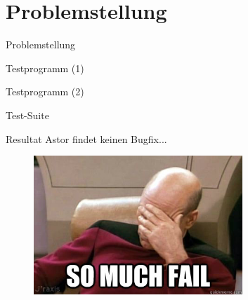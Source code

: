\section{Problemstellung}
%
\begin{frame}{}
	\begin{center}
		\huge{Problemstellung}
	\end{center}
\end{frame}
%
\begin{frame}{Testprogramm (1)}
	\begin{figure}
		\centering
	\end{figure}
\end{frame}
%
\begin{frame}{Testprogramm (2)}
	\begin{figure}
		\centering
	\end{figure}
\end{frame}
%
\begin{frame}{Test-Suite}
	\begin{figure}
		\centering
	\end{figure}
\end{frame}
%
\begin{frame}{Resultat}
	Astor findet keinen Bugfix...
	\begin{figure}
		\includegraphics[width=0.7\textwidth]{img/facepalm.jpg}
	\end{figure}
\end{frame}
